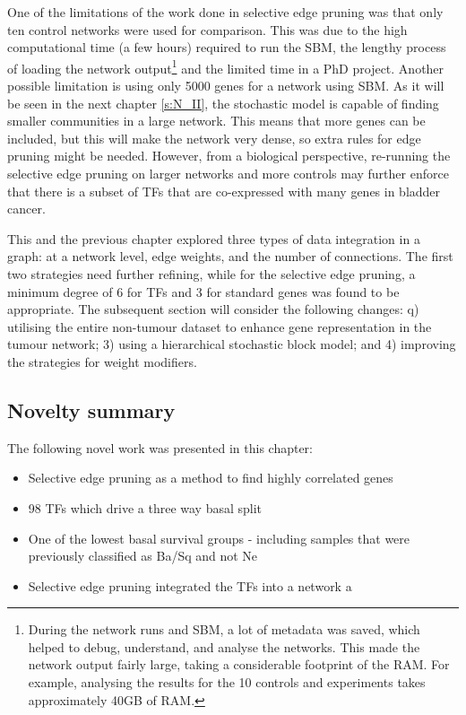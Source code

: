One of the limitations of the work done in selective edge pruning was that only ten control networks were used for comparison. This was due to the high computational time (a few hours) required to run the SBM, the lengthy process of loading the network output\footnote{During the network runs and SBM, a lot of metadata was saved, which helped to debug, understand, and analyse the networks. This made the network output fairly large, taking a considerable footprint of the RAM. For example, analysing the results for the 10 controls and experiments takes approximately 40GB of RAM.} and the limited time in a PhD project. Another possible limitation is using only 5000 genes for a network using SBM. As it will be seen in the next chapter \cref{s:N_II}, the stochastic model is capable of finding smaller communities in a large network. This means that more genes can be included, but this will make the network very dense, so extra rules for edge pruning might be needed. However, from a biological perspective, re-running the selective edge pruning on larger networks and more controls may further enforce that there is a subset of TFs that are co-expressed with many genes in bladder cancer.


This and the previous chapter explored three types of data integration in a graph: at a network level, edge weights, and the number of connections. The first two strategies need further refining, while for the selective edge pruning, a minimum degree of 6 for TFs and 3 for standard genes was found to be appropriate. The subsequent section will consider the following changes:  q) utilising the entire non-tumour dataset to enhance gene representation in the tumour network; 3) using a hierarchical stochastic block model; and 4) improving the strategies for weight modifiers.


\subsection*{Novelty summary}

The following novel work was presented in this chapter:
\begin{itemize}
    \item Selective edge pruning as a method to find highly correlated genes
    \item 98 TFs which drive a three way basal split
    \item One of the lowest basal survival groups - including samples that were previously classified as Ba/Sq and not Ne
    \item Selective edge pruning integrated the TFs into a network a
\end{itemize}